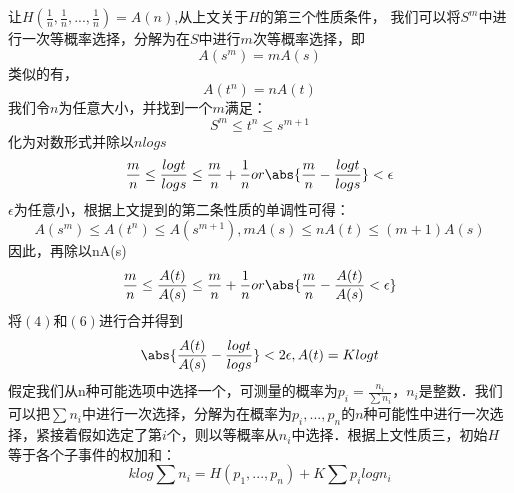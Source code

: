 让$H(\frac{1}{n},\frac{1}{n},...,\frac{1}{n})=A(n)$,从上文关于$H$的第三个性质条件，
我们可以将$S^m$中进行一次等概率选择，分解为在$S$中进行$m$次等概率选择，即
\begin{equation}
A(s^m)=mA(s)
\end{equation}
类似的有，
\begin{equation}
A(t^n)=nA(t)
\end{equation}
我们令$n$为任意大小，并找到一个$m$满足：
\begin{equation}
S^m\leq t^n\leq s^{m+1}
\end{equation}
化为对数形式并除以$nlogs$
\begin{equation}
\frac{m}{n}\leq \frac{logt}{logs}\leq \frac{m}{n}+\frac{1}{n} or \abs{\frac{m}{n}-\frac{logt}{logs}}< \epsilon
\end{equation}
$\epsilon$为任意小，根据上文提到的第二条性质的单调性可得：
\begin{equation}
A(s^m)\leq A(t^n) \leq A(s^{m+1}), mA(s)\leq nA(t) \leq (m+1)A(s)
\end{equation}
因此，再除以nA(s)
\begin{equation}
\frac{m}{n}\leq \frac{A(t)}{A(s)}\leq \frac{m}{n}+\frac{1}{n} or \abs{\frac{m}{n} -\frac{A(t)}{A(s)} <\epsilon}
\end{equation}
将$(4)$和$(6)$进行合并得到
\begin{equation}
\abs{\frac{A(t)}{A(s)} - \frac{logt}{logs}} <2\epsilon ,A(t)=Klogt
\end{equation}
假定我们从n种可能选项中选择一个，可测量的概率为$p_i=\frac{n_i}{\sum n_i}$，$n_i$是整数．我们可以把$\sum{n_i}$中进行一次选择，分解为在概率为$p_i,...,p_n$的$n$种可能性中进行一次选择，紧接着假如选定了第$i$个，则以等概率从$n_i$中选择．根据上文性质三，初始$H$等于各个子事件的权加和：
\begin{equation}
klog\sum n_i=H(p_1,...,p_n)+K\sum {p_ilogn_i}
\end{equation}
